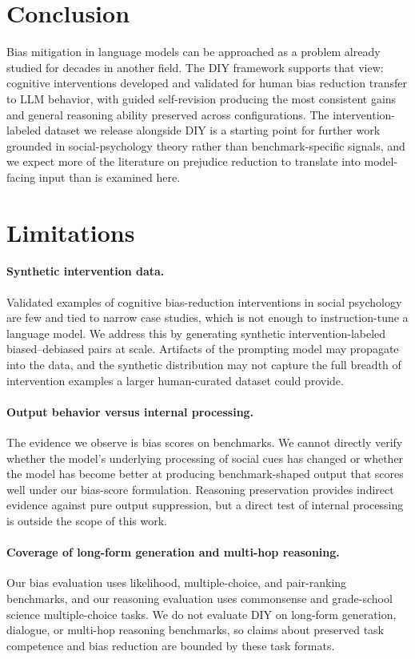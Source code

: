 \documentclass[11pt]{article}
\newcommand{\diylabel}{\textsc{DIY}}
\begin{document}
\section{Conclusion}
Bias mitigation in language models can be approached as a problem already studied for decades in another field. The \diylabel{} framework supports that view: cognitive interventions developed and validated for human bias reduction transfer to LLM behavior, with guided self-revision producing the most consistent gains and general reasoning ability preserved across configurations. The intervention-labeled dataset we release alongside \diylabel{} is a starting point for further work grounded in social-psychology theory rather than benchmark-specific signals, and we expect more of the literature on prejudice reduction to translate into model-facing input than is examined here.

\section*{Limitations}
\label{sec:limitations}

\paragraph{Synthetic intervention data.} Validated examples of cognitive bias-reduction interventions in social psychology are few and tied to narrow case studies, which is not enough to instruction-tune a language model. We address this by generating synthetic intervention-labeled biased--debiased pairs at scale. Artifacts of the prompting model may propagate into the data, and the synthetic distribution may not capture the full breadth of intervention examples a larger human-curated dataset could provide.

\paragraph{Output behavior versus internal processing.} The evidence we observe is bias scores on benchmarks. We cannot directly verify whether the model's underlying processing of social cues has changed or whether the model has become better at producing benchmark-shaped output that scores well under our bias-score formulation. Reasoning preservation provides indirect evidence against pure output suppression, but a direct test of internal processing is outside the scope of this work.

\paragraph{Coverage of long-form generation and multi-hop reasoning.} Our bias evaluation uses likelihood, multiple-choice, and pair-ranking benchmarks, and our reasoning evaluation uses commonsense and grade-school science multiple-choice tasks. We do not evaluate \diylabel{} on long-form generation, dialogue, or multi-hop reasoning benchmarks, so claims about preserved task competence and bias reduction are bounded by these task formats.
\end{document}
